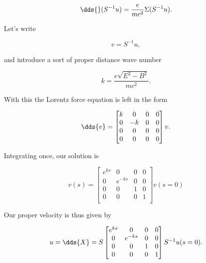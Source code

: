 \begin{equation}\label{eqn:relElectroDynProblemSet2:770}
\dds{} (S^{-1} u) = \frac{e}{m c^2} \Sigma (S^{-1} u).
\end{equation}

Let's write

\begin{equation}\label{eqn:relElectroDynProblemSet2:790}
v = S^{-1} u,
\end{equation}

and introduce a sort of proper distance wave number

\begin{equation}\label{eqn:relElectroDynProblemSet2:810}
k = \frac{e \sqrt{E^2 - B^2}}{m c^2}.
\end{equation}

With this the Lorentz force equation is left in the form

\begin{equation}\label{eqn:relElectroDynProblemSet2:830}
\dds{v} = 
\begin{bmatrix}
k & 0 & 0 & 0 \\
0 & -k & 0 & 0 \\
0 & 0 & 0 & 0 \\
0 & 0 & 0 & 0 \\
\end{bmatrix} v.
\end{equation}

Integrating once, our solution is

\begin{equation}\label{eqn:relElectroDynProblemSet2:850}
v(s) = 
\begin{bmatrix}
e^{ks} & 0 & 0 & 0 \\
0 & e^{-ks} & 0 & 0 \\
0 & 0 & 1 & 0 \\
0 & 0 & 0 & 1 \\
\end{bmatrix} v(s=0)
\end{equation}

Our proper velocity is thus given by

\begin{equation}\label{eqn:relElectroDynProblemSet2:870}
u = \dds{X} = S 
\begin{bmatrix}
e^{ks} & 0 & 0 & 0 \\
0 & e^{-ks} & 0 & 0 \\
0 & 0 & 1 & 0 \\
0 & 0 & 0 & 1 \\
\end{bmatrix} S^{-1} u(s=0).
\end{equation}

